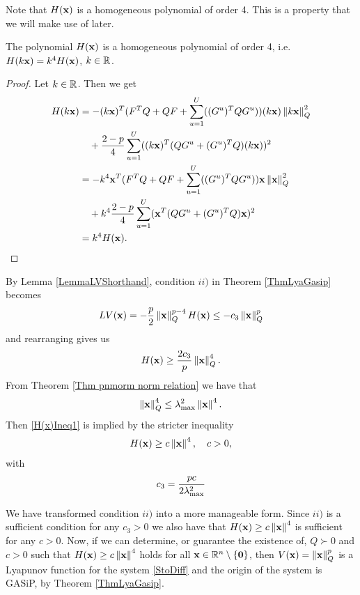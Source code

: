 \documentclass[a4paper,12pt,twoside,BCOR=10mm]{scrbook}
\begin{document}
Note that $H(\mathbf{x})$ is a homogeneous polynomial of order 4. This is a property that we will make use of later.
\begin{lemma}\label{LemmaH(x)Homogeneous}
The polynomial $H(\mathbf{x})$ is a homogeneous polynomial of order 4, i.e. $H(k\mathbf{x}) = k^4H(\mathbf{x})$, $k\in\mathbb{R}^{}$.
\end{lemma}
\begin{proof}
Let $k\in\mathbb{R}^{}$. Then we get
\begin{align*}
\begin{split}
    H(k\mathbf{x}) &= -(k\mathbf{x})^T(F^TQ + QF + \sum_{u=1}^U((G^u)^TQG^u))(k\mathbf{x})\left\lVert k\mathbf{x}\right\rVert_{Q}^{2}\\
    &\quad + \frac{2 - p}{4}\sum_{u=1}^U((k\mathbf{x})^T (QG^u + (G^u)^TQ)(k\mathbf{x}))^2\\
    &= -k^4\mathbf{x}^T(F^TQ + QF +\sum_{u = 1}^U ((G^u)^T Q G^u))\mathbf{x}\left\lVert\mathbf{x}\right\rVert_{Q}^{2}\\
    &\quad + k^4 \frac{2 - p}{4}\sum_{u=1}^U(\mathbf{x}^T(QG^u + (G^u)^TQ)\mathbf{x})^2\\
    &= k^4H(\mathbf{x}).
\end{split}
\end{align*}
\end{proof}
By Lemma \ref{LemmaLVShorthand}, condition $ii)$ in Theorem \ref{ThmLyaGasip} becomes
\begin{align*}
    LV(\mathbf{x}) = -\frac{p}{2}\left\lVert\mathbf{x}\right\rVert_{Q}^{p - 4}H(\mathbf{x}) \leq -c_3\left\lVert\mathbf{x}\right\rVert_Q^p
\end{align*}
and rearranging gives us
\begin{align}\label{H(x)Ineq1}
    H(\mathbf{x}) \geq \frac{2c_3}{p}\left\lVert\mathbf{x}\right\rVert_{Q}^{4}.
\end{align}
From Theorem \ref{Thm pnmorm norm relation} we have that
\begin{align*}
    \left\lVert\mathbf{x}\right\rVert_{Q}^{4} \leq \lambda_{\max}^2 \left\lVert\mathbf{x}\right\rVert^4.
\end{align*}
Then \eqref{H(x)Ineq1} is implied by the stricter inequality
\begin{align}\label{H(x)Ineq3}
    H(\mathbf{x}) \geq c\left\lVert\mathbf{x}\right\rVert_{}^{4}, \quad c > 0,
\end{align}
with
\begin{align*}
    c_3 = \frac{pc}{2 \lambda_{\max}^2}
\end{align*}

We have transformed condition $ii)$ into a more manageable form. Since $ii)$ is a sufficient condition for any $c_3 > 0$ we also have that $H(\mathbf{x}) \geq c\left\lVert\mathbf{x}\right\rVert_{}^{4}$ is sufficient for any $c > 0$. Now, if we can determine, or guarantee the existence of, $Q \succ 0$ and $c > 0$ such that $H(\mathbf{x}) \geq c\left\lVert\mathbf{x}\right\rVert_{}^{4}$ holds for all $\mathbf{x} \in \mathbb{R}^{n}\setminus \{\mathbf{0}\}$, then $V(\mathbf{x}) = \left\lVert\mathbf{x}\right\rVert_{Q}^{p}$ is a Lyapunov function for the system \eqref{StoDiff} and the origin of the system is GASiP, by Theorem \ref{ThmLyaGasip}.
\end{document}
